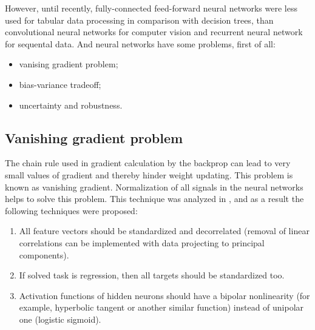 \documentclass{article}
\begin{document}
However, until recently, fully-connected feed-forward neural networks were less used for tabular data processing in comparison with decision trees, than convolutional neural networks for computer vision and recurrent neural network for sequental data. And neural networks have some problems, first of all:

\begin{itemize}
    \item vanising gradient problem;
    \item bias-variance tradeoff;
    \item uncertainty and robustness.
\end{itemize}

\subsection{Vanishing gradient problem}
\label{vanishing}

The chain rule used in gradient calculation by the backprop can lead to very small values of gradient and thereby hinder weight updating. This problem is known as vanishing gradient. Normalization of all signals in the neural networks helps to solve this problem. This technique was analyzed in \cite{lecun98backprop}, and as a result the following techniques were proposed:

\begin{enumerate}
    \item All feature vectors should be standardized and decorrelated (removal of linear correlations can be implemented with data projecting to principal components).
    \item If solved task is regression, then all targets should be standardized too.
    \item Activation functions of hidden neurons should have a bipolar nonlinearity (for example, hyperbolic tangent or another similar function) instead of unipolar one (logistic sigmoid).
\end{enumerate}
\end{document}
